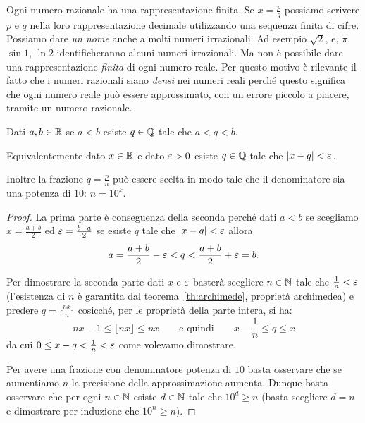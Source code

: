 
Ogni numero razionale ha una rappresentazione finita. 
Se $x=\frac p q$ possiamo scrivere $p$ e $q$ nella loro rappresentazione 
decimale utilizzando una sequenza finita di cifre.
Possiamo dare \emph{un nome} anche a molti
numeri irrazionali. 
Ad esempio $\sqrt 2$, $e$, $\pi$, $\sin 1$, $\ln 2$ identificheranno 
alcuni numeri irrazionali. 
Ma non è possibile dare una rappresentazione \emph{finita} di ogni numero reale.
Per questo motivo è rilevante il fatto che i numeri razionali siano \emph{densi}
nei numeri reali perché questo significa che ogni numero reale può essere 
approssimato, con un errore piccolo a piacere, tramite un numero razionale.

\begin{theorem}[densità di $\QQ$ in $\RR$]
\label{th:densita_frazioni}%
%
%
Dati $a,b\in {\mathbb R}$ se $a<b$ esiste $q\in {\mathbb Q}$ tale che $a< q < b$.

Equivalentemente dato $x\in {\mathbb R}$ e dato $\varepsilon>0$ esiste $q\in {\mathbb Q}$ 
tale che ${\left|x-q\right|} < \varepsilon$.

Inoltre la frazione $q= \frac{p}{n}$ può essere scelta 
in modo tale che il denominatore sia una potenza di $10$: $n=10^k$.
\end{theorem}
\begin{proof}
La prima parte è conseguenza della seconda perché 
dati $a<b$
se scegliamo 
$x= \frac{a+b}{2}$ ed $\varepsilon = \frac{b-a} 2$ se 
esiste $q$ tale che ${\left|x-q\right|}< \varepsilon$ 
allora 
\[
   a = \frac{a+b}{2} - \varepsilon < q < \frac{a+b}{2} + \varepsilon = b.
\]

Per dimostrare la seconda parte dati $x$ e $\varepsilon$ basterà scegliere 
$n\in {\mathbb N}$ tale che $\frac 1 n < \varepsilon$ (l'esistenza di $n$ è garantita 
dal teorema~\ref{th:archimede}, proprietà archimedea) e predere $q = \frac{\lfloor nx\rfloor}{n}$
cosicché, per le proprietà della parte intera, si ha:
\[
  nx-1\le \lfloor nx\rfloor \le nx 
  \qquad\text{e quindi}\qquad
  x - \frac 1 n \le q \le x
\]
da cui $0 \le x-q < \frac 1 n < \varepsilon$ come volevamo dimostrare.

Per avere una frazione con denominatore potenza di $10$ basta osservare 
che se aumentiamo $n$ la precisione della approssimazione aumenta. 
Dunque basta osservare che per ogni $n\in {\mathbb N}$ esiste $d\in {\mathbb N}$
tale che $10^d \ge n$ (basta scegliere $d=n$ e dimostrare per induzione 
che $10^n\ge n$).
\end{proof}

